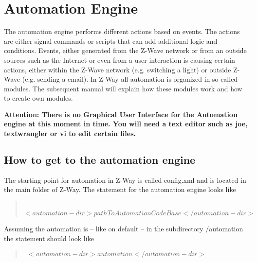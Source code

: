 \section{Automation Engine}
\label{modules}

 

The automation engine performs different actions based on events.  The actions are either 
signal commands or scripts that can add additional logic and conditions.
Events, either generated 
from the Z-Wave network or from an outside sources such as the Internet or even from a 
user interaction is causing certain actions, either within the Z-Wave network (e.g. 
switching a light) or outside Z-Wave (e.g. sending a email). In Z-Way all automation 
is organized in so called modules. The subsequent manual will explain how these 
modules work and how to create own modules.

{\bf Attention: There is no Graphical User Interface for the Automation engine at this 
moment in time. You will need a text editor such as joe, textwrangler or vi to edit 
certain files. }

\subsection{How to get to the automation engine}

The starting point for automation in Z-Way is called config.xml and is located in the main 
folder of Z-Way. The statement for the automation engine looks like

\begin{quote}
{\tt  
$<automation-dir>pathToAutomationCodeBase</automation-dir>$
}
\end{quote}
Assuming the automation is – like on default – in the subdirectory /automation the 
statement should look like

\begin{quote}
{\tt  
$<automation-dir>automation </automation-dir>$
}
\end{quote}

